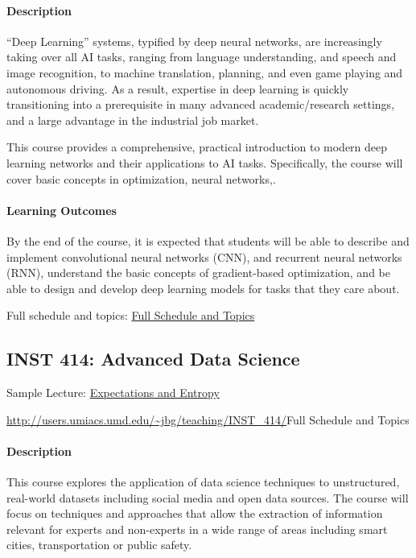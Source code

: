 \documentclass{article}
\begin{document}
\paragraph{Description}
``Deep Learning'' systems, typified by deep neural networks, are increasingly taking over all AI tasks, ranging from language understanding, and speech and image recognition, to machine translation, planning, and even game playing and autonomous driving. As a result, expertise in deep learning is quickly transitioning into a prerequisite in many advanced academic/research settings, and a large advantage in the industrial job market.

This course provides a comprehensive, practical introduction to modern deep learning networks and their applications to AI tasks. Specifically, the course will cover basic concepts in optimization, neural networks,.

\paragraph{Learning Outcomes} By the end of the course, it is expected that students will be able to describe and implement convolutional neural networks (CNN), and recurrent neural networks (RNN), understand the basic concepts of gradient-based optimization, and be able to design and develop deep learning models for tasks that they care about.

Full schedule and topics: \href{https://umd-cs-stics.gitbooks.io/cmsc389a-practical-deep-learning/content/}{Full Schedule and Topics}

\subsection{INST 414: Advanced Data Science}

\begin{itemize*}
\item Sample Lecture: \href{https://www.youtube.com/watch?v=O28U08_yaGU}{Expectations and Entropy}
\item \url{http://users.umiacs.umd.edu/~jbg/teaching/INST_414/}{Full Schedule and Topics}
\end{itemize*}

\paragraph{Description}
This course explores the application of data science techniques to unstructured, real-world datasets including social media and open data sources. The course will focus on techniques and approaches that allow the extraction of information relevant for experts and non-experts in a wide range of areas including smart cities, transportation or public safety.
\end{document}
